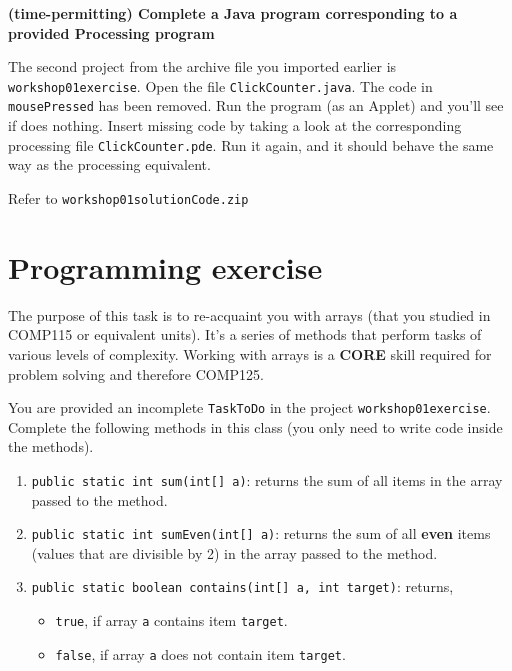 \begin{questions}
\question \textbf{(time-permitting) Complete a Java program corresponding to a provided Processing program} \vskip 0.5cm

The second project from the archive file you imported earlier is \texttt{workshop01exercise}. Open the file \texttt{ClickCounter.java}. The code in \texttt{mousePressed} has been removed. Run the program (as an Applet) and you'll see if does nothing. Insert missing code by taking a look at the corresponding processing file \texttt{ClickCounter.pde}. Run it again, and it should behave the same way as the processing equivalent.

\begin{solution}
Refer to \texttt{workshop01solutionCode.zip}	
\end{solution}

\section*{Programming exercise}

\question The purpose of this task is to re-acquaint you with arrays (that you studied in COMP115 or equivalent units). It's a series of methods that perform tasks of various levels of complexity. Working with arrays is a \textbf{CORE} skill required for problem solving and therefore COMP125. 

You are provided an incomplete \texttt{TaskToDo} in the project \texttt{workshop01exercise}. Complete the following methods in this class (you only need to write code inside the methods). 

\begin{enumerate}
\item \texttt{public static int sum(int[] a)}: returns the sum of all items in the array passed to the method. 

\item \texttt{public static int sumEven(int[] a)}: returns the sum of all \textbf{even} items (values that are divisible by 2) in the array passed to the method. 

\item \texttt{public static boolean contains(int[] a, int target)}: returns,
	
	\begin{itemize}
		\item \texttt{true}, if array \texttt{a} contains item \texttt{target}.
		\item \texttt{false}, if array \texttt{a} does not contain item \texttt{target}.
	\end{itemize}
 

\end{enumerate}
\end{questions}
